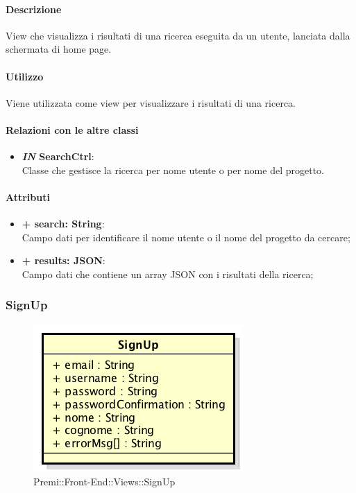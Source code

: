 	\paragraph{Descrizione}
	View che visualizza i risultati di una ricerca eseguita da un utente, lanciata dalla schermata di home page.
	
	\paragraph{Utilizzo}
	Viene utilizzata come view per visualizzare i risultati di una ricerca.
	
	\paragraph{Relazioni con le altre classi}
	\begin{itemize}
		\item \textbf{\textit{IN} SearchCtrl}:\\
		Classe che gestisce la ricerca per nome utente o per nome del progetto.
	\end{itemize}
	
	\paragraph{Attributi}
	\begin{itemize}
		\item \textbf{+ search: String}:\\
		Campo dati per identificare il nome utente o il nome del progetto da cercare;
		\item \textbf{+ results: JSON}:\\
		Campo dati che contiene un array JSON con i risultati della ricerca;
	\end{itemize}
	
	
\subsubsection{SignUp}
	\begin{figure}[h]
		\centering
		\includegraphics[width=0.3\linewidth]{img/premi_front_end_views_signup}
		\caption[Premi::Front-End::Views::SignUp]{Premi::Front-End::Views::SignUp}
	\end{figure}
	
